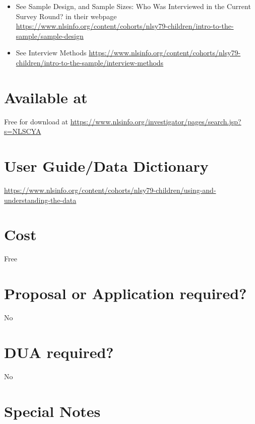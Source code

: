 \documentclass[
]{book}
\providecommand{\tightlist}{%
  \setlength{\itemsep}{0pt}\setlength{\parskip}{0pt}}
\begin{document}
\begin{itemize}
\tightlist
\item
  See Sample Design, and Sample Sizes: Who Was Interviewed in the Current Survey Round? in their webpage \url{https://www.nlsinfo.org/content/cohorts/nlsy79-children/intro-to-the-sample/sample-design}
\item
  See Interview Methods
  \url{https://www.nlsinfo.org/content/cohorts/nlsy79-children/intro-to-the-sample/interview-methods}
\end{itemize}

\hypertarget{available-at-59}{%
\section{Available at}\label{available-at-59}}

Free for download at \url{https://www.nlsinfo.org/investigator/pages/search.jsp?s=NLSCYA}

\hypertarget{user-guidedata-dictionary-59}{%
\section{User Guide/Data Dictionary}\label{user-guidedata-dictionary-59}}

\url{https://www.nlsinfo.org/content/cohorts/nlsy79-children/using-and-understanding-the-data}

\hypertarget{cost-59}{%
\section{Cost}\label{cost-59}}

Free

\hypertarget{proposal-or-application-required-59}{%
\section{Proposal or Application required?}\label{proposal-or-application-required-59}}

No

\hypertarget{dua-required-59}{%
\section{DUA required?}\label{dua-required-59}}

No

\hypertarget{special-notes-59}{%
\section{Special Notes}\label{special-notes-59}}
\end{document}

